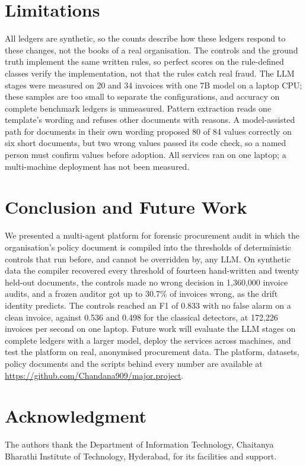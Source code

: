 \documentclass[9pt,a4paper,twocolumn]{extarticle}
\begin{document}
\section{Limitations}
All ledgers are synthetic, so the counts describe how these ledgers respond to these changes, not the books of a real organisation. The controls and the ground truth implement the same written rules, so perfect scores on the rule-defined classes verify the implementation, not that the rules catch real fraud. The LLM stages were measured on 20 and 34 invoices with one 7B model on a laptop CPU; these samples are too small to separate the configurations, and accuracy on complete benchmark ledgers is unmeasured. Pattern extraction reads one template's wording and refuses other documents with reasons. A model-assisted path for documents in their own wording proposed 80 of 84 values correctly on six short documents, but two wrong values passed its code check, so a named person must confirm values before adoption. All services ran on one laptop; a multi-machine deployment has not been measured.

\section{Conclusion and Future Work}
We presented a multi-agent platform for forensic procurement audit in which the organisation's policy document is compiled into the thresholds of deterministic controls that run before, and cannot be overridden by, any LLM. On synthetic data the compiler recovered every threshold of fourteen hand-written and twenty held-out documents, the controls made no wrong decision in 1{,}360{,}000 invoice audits, and a frozen auditor got up to 30.7\% of invoices wrong, as the drift identity predicts. The controls reached an F1 of 0.833 with no false alarm on a clean invoice, against 0.536 and 0.498 for the classical detectors, at 172{,}226 invoices per second on one laptop. Future work will evaluate the LLM stages on complete ledgers with a larger model, deploy the services across machines, and test the platform on real, anonymised procurement data. The platform, datasets, policy documents and the scripts behind every number are available at \url{https://github.com/Chandana909/major.project}.

\section*{Acknowledgment}
The authors thank the Department of Information Technology, Chaitanya Bharathi Institute of Technology, Hyderabad, for its facilities and support.
\end{document}
